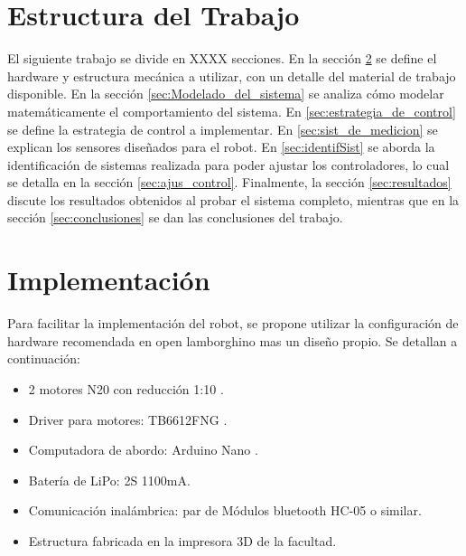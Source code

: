\documentclass[10pt,conference,a4paper,onecolumn]{article}%
\begin{document}
\section{Estructura del Trabajo}
El siguiente trabajo se divide en XXXX secciones. En la sección \ref{sec:implementacion} se define el hardware y estructura mecánica a utilizar, con un detalle del material de trabajo disponible. En la sección \ref{sec:Modelado_del_sistema} se analiza cómo modelar matemáticamente el comportamiento del sistema. En  \ref{sec:estrategia_de_control} se define la estrategia de control a implementar. En \ref{sec:sist_de_medicion} se explican los sensores diseñados para el robot. En \ref{sec:identifSist} se aborda la identificación de sistemas realizada para poder ajustar los controladores, lo cual se detalla en la sección \ref{sec:ajus_control}. Finalmente, la sección \ref{sec:resultados} discute los resultados obtenidos al probar el sistema completo, mientras que en la sección \ref{sec:conclusiones} se dan las conclusiones del trabajo.

\section{Implementación}
\label{sec:implementacion}
Para facilitar la implementación del robot, se propone utilizar la configuración de hardware recomendada en open lamborghino mas un diseño propio. Se detallan a continuación:
\begin{itemize}
\item 2 motores N20 con reducción 1:10 \cite{motores}. 
\item Driver para motores: TB6612FNG \cite{puenteH}.
\item Computadora de abordo: Arduino Nano \cite{arduinoNano}.
\item Batería de LiPo: 2S 1100mA.
\item Comunicación inalámbrica: par de Módulos bluetooth HC-05 o similar.  
\item Estructura fabricada en la impresora 3D de la facultad.

\end{itemize}
\end{document}
